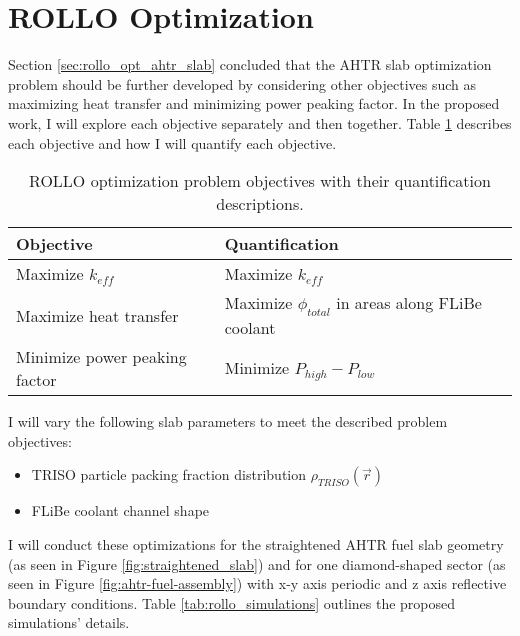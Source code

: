 \section{ROLLO Optimization}
Section \ref{sec:rollo_opt_ahtr_slab} concluded that the \gls{AHTR} slab 
optimization problem should be further developed by considering other objectives 
such as maximizing heat transfer and minimizing power peaking factor. 
In the proposed work, I will explore each objective separately and then together.
Table \ref{tab:objectives} describes each objective and how I will quantify 
each objective. 
\begin{table}[!htbp]
    \centering
    \onehalfspacing
    \caption{\acrfull{ROLLO} optimization problem objectives with their quantification 
    descriptions.}
	\label{tab:objectives}
    \footnotesize
    \begin{tabular}{p{5cm}p{7cm}}
    \hline 
    \textbf{Objective}& \textbf{Quantification}  \\
    \hline
    Maximize $k_{eff}$ & Maximize $k_{eff}$\\ 
    Maximize heat transfer & Maximize $\phi_{total}$ in areas along FLiBe coolant \\
    Minimize power peaking factor & Minimize $P_{high}-P_{low}$ \\
    \hline
    \end{tabular}
\end{table}
I will vary the following slab parameters to meet the described problem objectives: 
\begin{itemize}
    \item \gls{TRISO} particle packing fraction distribution $\rho_{TRISO}(\vec{r})$
    \item \gls{FLiBe} coolant channel shape 
\end{itemize} 
I will conduct these optimizations for the straightened \gls{AHTR} fuel slab 
geometry (as seen in Figure \ref{fig:straightened_slab}) and for one 
diamond-shaped sector (as seen in Figure \ref{fig:ahtr-fuel-assembly}) with 
x-y axis periodic and z axis reflective boundary conditions. 
Table \ref{tab:rollo_simulations} outlines the proposed simulations' details. 
